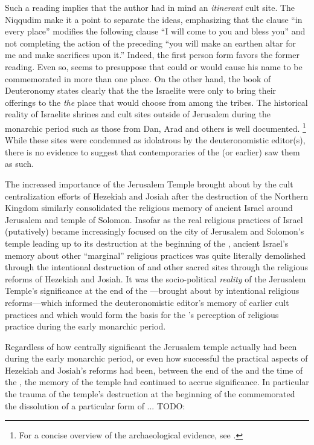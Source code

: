 Such a reading implies that the author had in mind an \emph{itinerant} cult site. The Niqqudim make it a point to separate the ideas, emphasizing that the clause  ``in every place'' modifies the following clause  ``I will come to you and bless you'' and not completing the action of the preceding  ``you will make an earthen altar for me and make sacrifices upon it.'' Indeed, the first person form  favors the former reading. Even so,  seems to presuppose that \yahweh could or would cause his name to be commemorated in more than one place. On the other hand, the book of Deuteronomy states clearly that the the Israelite were only to bring their offerings to the \emph{the} place that \yahweh would choose from among the tribes. The historical reality of Israelite shrines and cult sites outside of Jerusalem during the monarchic period such as those from Dan, Arad and others is well documented.%
    \footnote{For a concise overview of the archaeological evidence, see \cite[319--352]{king-stager2001}.}
While these sites were condemned as idolatrous by the deuteronomistic editor(s), there is no evidence to suggest that contemporaries of the  (or earlier) saw them as such.

The increased importance of the Jerusalem Temple brought about by the cult centralization efforts of Hezekiah and Josiah after the destruction of the Northern Kingdom similarly consolidated the religious memory of ancient Israel around Jerusalem and temple of Solomon. Insofar as the real religious practices of Israel (putatively) became increasingly focused on the city of Jerusalem and Solomon's temple leading up to its destruction at the beginning of the , ancient Israel's memory about other ``marginal'' religious practices was quite literally demolished through the intentional destruction of  and other sacred sites through the religious reforms of Hezekiah and Josiah. It was the socio-political \emph{reality} of the Jerusalem Temple's significance at the end of the ---brought about by intentional religious reforms---which informed the deuteronomistic editor's memory of earlier \yahwistic cult practices and which would form the basis for the \chronicler's perception of religious practice during the early monarchic period. 

Regardless of how centrally significant the Jerusalem temple actually had been during the early monarchic period, or even how successful the practical aspects of Hezekiah and Josiah's reforms had been, between the end of the  and the time of the \chronicler, the memory of the temple had continued to accrue significance. In particular the trauma of the temple's destruction at the beginning of the  commemorated the dissolution of a particular form of ... TODO:

